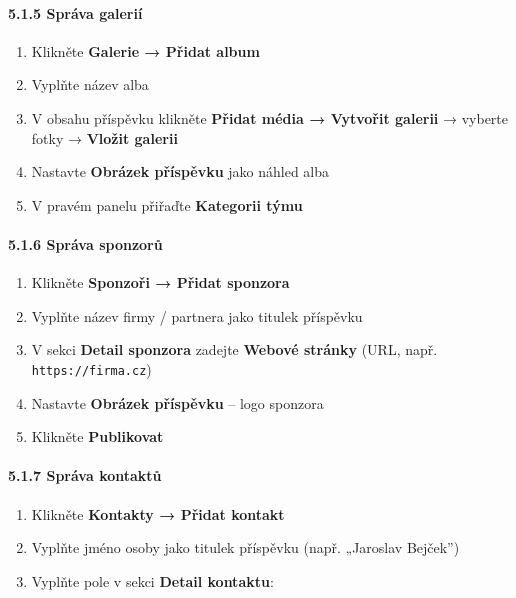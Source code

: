 \paragraph{5.1.5 Správa galerií}\label{spruxe1va-galeriuxed}

\begin{enumerate}
\def\labelenumi{\arabic{enumi}.}
\tightlist
\item
  Klikněte \textbf{Galerie → Přidat album}
\item
  Vyplňte název alba
\item
  V obsahu příspěvku klikněte \textbf{Přidat média → Vytvořit galerii} →
  vyberte fotky → \textbf{Vložit galerii}
\item
  Nastavte \textbf{Obrázek příspěvku} jako náhled alba
\item
  V pravém panelu přiřaďte \textbf{Kategorii týmu}
\end{enumerate}

\paragraph{5.1.6 Správa sponzorů}\label{spruxe1va-sponzorux16f}

\begin{enumerate}
\def\labelenumi{\arabic{enumi}.}
\tightlist
\item
  Klikněte \textbf{Sponzoři → Přidat sponzora}
\item
  Vyplňte název firmy / partnera jako titulek příspěvku
\item
  V sekci \textbf{Detail sponzora} zadejte \textbf{Webové stránky} (URL,
  např. \texttt{https://firma.cz})
\item
  Nastavte \textbf{Obrázek příspěvku} -- logo sponzora
\item
  Klikněte \textbf{Publikovat}
\end{enumerate}

\paragraph{5.1.7 Správa kontaktů}\label{spruxe1va-kontaktux16f}

\begin{enumerate}
\def\labelenumi{\arabic{enumi}.}
\tightlist
\item
  Klikněte \textbf{Kontakty → Přidat kontakt}
\item
  Vyplňte jméno osoby jako titulek příspěvku (např. „Jaroslav Bejček'')
\item
  Vyplňte pole v sekci \textbf{Detail kontaktu}:
\end{enumerate}

